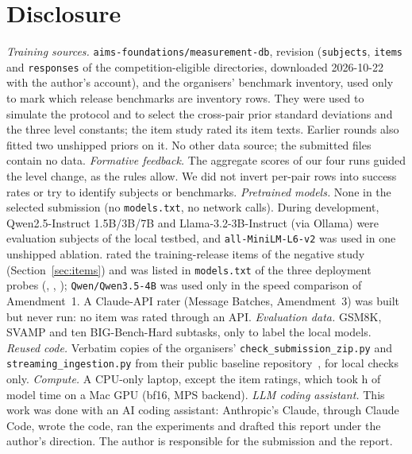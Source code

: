 \documentclass{article}
\begin{document}
\section{Disclosure}
\label{sec:disclosure}

\emph{Training sources.} \texttt{aims-foundations/measurement-db}, revision \texttt{\FitRevisionShort} (\texttt{subjects}, \texttt{items} and \texttt{responses} of the \FitNEligible{} competition-eligible directories, downloaded 2026-10-22 with the author's account), and the organisers' benchmark inventory, used only to mark which release benchmarks are inventory rows. They were used to simulate the protocol and to select the cross-pair prior standard deviations and the three level constants; the item study rated its item texts. Earlier rounds also fitted two unshipped priors on it. No other data source; the submitted files contain no data. \emph{Formative feedback.} The aggregate scores of our four runs guided the level change, as the rules allow. We did not invert per-pair rows into success rates or try to identify subjects or benchmarks. \emph{Pretrained models.} None in the selected submission (no \texttt{models.txt}, no network calls). During development, Qwen2.5-Instruct 1.5B/3B/7B and Llama-3.2-3B-Instruct (via Ollama) were evaluation subjects of the local testbed, and \texttt{all-MiniLM-L6-v2} was used in one unshipped ablation. \texttt{\ItModel} rated the training-release items of the negative study (Section~\ref{sec:items}) and was listed in \texttt{models.txt} of the three deployment probes (\ProbeAId, \ProbeBId, \ProbeCId); \texttt{Qwen/Qwen3.5-4B} was used only in the speed comparison of Amendment~1. A Claude-API rater (Message Batches, Amendment~3) was built but never run: no item was rated through an API. \emph{Evaluation data.} GSM8K, SVAMP and ten BIG-Bench-Hard subtasks, only to label the local models. \emph{Reused code.} Verbatim copies of the organisers' \texttt{check\_submission\_zip.py} and \texttt{streaming\_ingestion.py} from their public baseline repository~\citep{paiec_baselines_2026}, for local checks only. \emph{Compute.} A CPU-only laptop, except the item ratings, which took \ItRatingHours{} h of model time on a Mac GPU (bf16, MPS backend). \emph{LLM coding assistant.} This work was done with an AI coding assistant: Anthropic's Claude, through Claude Code, wrote the code, ran the experiments and drafted this report under the author's direction. The author is responsible for the submission and the report.



\end{document}
